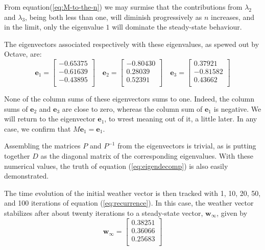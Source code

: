 \documentclass[
  12pt,
  a4paper,
]{article}
\begin{document}
From equation(\ref{eq:M-to-the-n}) we may surmise that the contributions
from \(\lambda_{2}\) and \(\lambda_{3}\), being both less than one, will
diminish progressively as \(n\) increases, and in the limit, only the
eigenvalue \(1\) will dominate the steady-state behaviour.

The eigenvectors associated respectively with these eigenvalues, as
spewed out by Octave, are: \[
\symbf{e}_{1} = \begin{bmatrix}
-0.65375\\
-0.61639\\
-0.43895\\
\end{bmatrix}
\quad
\symbf{e}_{2} = \begin{bmatrix}
-0.80430\\
0.28039\\
0.52391\\
\end{bmatrix}
\quad
\symbf{e}_{3} = \begin{bmatrix}
0.37921\\
-0.81582\\
0.43662\\
\end{bmatrix}
\]

None of the column sums of these eigenvectors sums to one. Indeed, the
column sums of \(\symbf{e}_{2}\) and \(\symbf{e}_{3}\) are close to
zero, whereas the column sum of \(\symbf{e}_{1}\) is negative. We will
return to the eigenvector \(\symbf{e}_{1}\), to wrest meaning out of it,
a little later. In any case, we confirm that
\(M\symbf{e}_{1} = \symbf{e}_{1}\).

Assembling the matrices \(P\) and \(P^{-1}\) from the eigenvectors is
trivial, as is putting together \(D\) as the diagonal matrix of the
corresponding eigenvalues. With these numerical values, the truth of
equation (\ref{eq:eigendecomp}) is also easily demonstrated.

The time evolution of the initial weather vector is then tracked with 1,
10, 20, 50, and 100 iterations of equation (\ref{eq:recurrence}). In
this case, the weather vector stabilizes after about twenty iterations
to a steady-state vector, \(\symbf{w}_{\infty}\), given by
\begin{equation}
\symbf{w}_{\infty} = \begin{bmatrix}
0.38251\\
0.36066\\
0.25683\\
\end{bmatrix}
\label{eq:steady-state}\end{equation}
\end{document}
